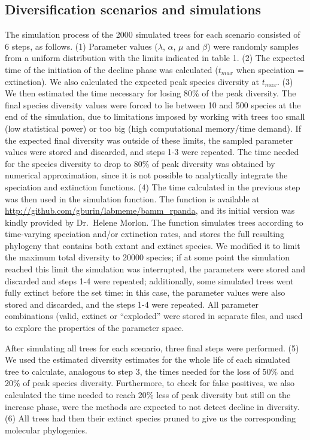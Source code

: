 \documentclass[12pt,]{article}
\begin{document}
\subsection{Diversification scenarios and
simulations}\label{diversification-scenarios-and-simulations}

The simulation process of the 2000 simulated trees for each scenario
consisted of 6 steps, as follows. (1) Parameter values (\(\lambda\),
\(\alpha\), \(\mu\) and \(\beta\)) were randomly samples from a uniform
distribution with the limits indicated in table 1. (2) The expected time
of the initiation of the decline phase was calculated (\(t_{max}\) when
speciation = extinction). We also calculated the expected peak species
diversity at \(t_{max}\). (3) We then estimated the time necessary for
losing 80\% of the peak diversity. The final species diversity values
were forced to lie between 10 and 500 species at the end of the
simulation, due to limitations imposed by working with trees too small
(low statistical power) or too big (high computational memory/time
demand). If the expected final diversity was outside of these limits,
the sampled parameter values were stored and discarded, and steps 1-3
were repeated. The time needed for the species diversity to drop to 80\%
of peak diversity was obtained by numerical approximation, since it is
not possible to analytically integrate the speciation and extinction
functions. (4) The time calculated in the previous step was then used in
the simulation function. The function is available at
\url{http://github.com/gburin/labmeme/bamm_rpanda}, and its initial
version was kindly provided by Dr.~Helene Morlon. The function simulates
trees according to time-varying speciation and/or extinction rates, and
stores the full resulting phylogeny that contains both extant and
extinct species. We modified it to limit the maximum total diversity to
20000 species; if at some point the simulation reached this limit the
simulation was interrupted, the parameters were stored and discarded and
steps 1-4 were repeated; additionally, some simulated trees went fully
extinct before the set time: in this case, the parameter values were
also stored and discarded, and the steps 1-4 were repeated. All
parameter combinations (valid, extinct or ``exploded'' were stored in
separate files, and used to explore the properties of the parameter
space.

After simulating all trees for each scenario, three final steps were
performed. (5) We used the estimated diversity estimates for the whole
life of each simulated tree to calculate, analogous to step 3, the times
needed for the loss of 50\% and 20\% of peak species diversity.
Furthermore, to check for false positives, we also calculated the time
needed to reach 20\% less of peak diversity but still on the increase
phase, were the methods are expected to not detect decline in diversity.
(6) All trees had then their extinct species pruned to give us the
corresponding molecular phylogenies.
\end{document}
